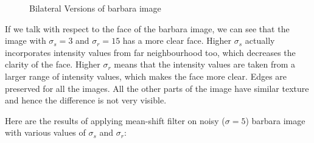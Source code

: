 \documentclass[12pt]{article}
\begin{document}
\begin{figure}[h]
    \caption{Bilateral Versions of barbara image }
    \label{fig:overall}
\end{figure}

If we talk with respect to the face of the barbara image, we can see that the image with $\sigma_s = 3$ and $\sigma_r = 15$ has a more clear face. Higher $\sigma_s$ actually incorporates intensity values from far neighbourhood too, which decreases the clarity of the face. Higher $\sigma_r$ means that the intensity values are taken from a larger range of intensity values, which makes the face more clear. Edges are preserved for all the images. All the other parts of the image have similar texture and hence the difference is not very visible.


Here are the results of applying mean-shift filter on noisy ($\sigma = 5$) barbara image with various values of $\sigma_s$ and $\sigma_r$:
\end{document}
